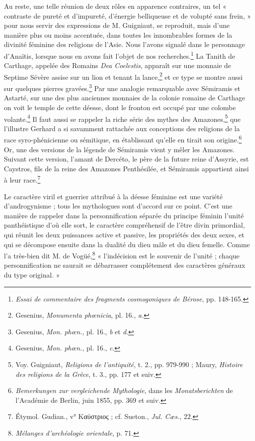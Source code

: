 \documentclass[a4paper, 11pt, oneside, landscape]{article}
\begin{document}
Au reste, une telle réunion de deux rôles en apparence contraires, un tel « contraste de pureté et d'impureté, d'énergie belliqueuse et de volupté sans frein, » pour nous servir des expressions de M. Guigniaut, se reproduit, mais d'une manière plus ou moins accentuée, dans toutes les innombrables formes de la divinité féminine des religions de l'Asie. Nous l'avons signalé dans le personnage d'Anaïtis, lorsque nous en avons fait l'objet de nos recherches.\footnote{\emph{Essai de commentaire des fragments cosmogoniques de Bérose}, pp. 148-165.} La Tanith de Carthage, appelée des Romains \emph{Dea Coelestis}, apparaît sur une monnaie de Septime Sévère assise sur un lion et tenant la lance,\footnote{Gesenius, \emph{Monumenta phœnicia}, pl. 16., \emph{a.}} et ce type se montre aussi sur quelques pierres gravées.\footnote{Gesenius, \emph{Mon. phœn.}, pl. 16., \emph{b} et \emph{d}.} Par une analogie remarquable avec Sémiramis et Astarté, sur une des plus anciennes monnaies de la colonie romaine de Carthage on voit le temple de cette déesse, dont le fronton est occupé par une colombe volante.\footnote{Gesenius, \emph{Mon. phœn.}, pl. 16., \emph{c}.} Il faut aussi se rappeler la riche série des mythes des Amazones,\footnote{Voy. Guigniaut, \emph{Religions de l'antiquité}, t. 2., pp. 979-990 ; Maury, \emph{Histoire des religions de la Grèce}, t. 3., pp. 177 et suiv.} que l'illustre Gerhard a si savamment rattachée aux conceptions des religions de la race syro-phénicienne ou sémitique, en établissant qu'elle en tirait son origine.\footnote{\emph{Bemerkungen zur vergleichende Mythologie}, dans les \emph{Monatsberichten} de l'Académie de Berlin, juin 1855, pp. 369 et suiv.} Or, une des versions de la légende de Sémiramis vient y mêler les Amazones. Suivant cette version, l'amant de Dercéto, le père de la future reine d'Assyrie, est Caystros, fils de la reine des Amazones Penthésilée, et Sémiramis appartient ainsi à leur race.\footnote{Étymol. Gudian., v° Καύστριος ; cf. Sueton., \emph{Jul. Cæs.}, 22.}

Le caractère viril et guerrier attribué à la déesse féminine est une variété d'androgynisme ; tous les mythologues sont d'accord sur ce point. C'est une manière de rappeler dans la personnification séparée du principe féminin l'unité panthéistique d'où elle sort, le caractère compréhensif de l'être divin primordial, qui réunit les deux puissances active et passive, les propriétés des deux sexes, et qui se décompose ensuite dans la dualité du dieu mâle et du dieu femelle. Comme l'a très-bien dit M. de Vogüé,\footnote{\emph{Mélanges d'archéologie orientale}, p. 71.} « l'indécision est le souvenir de l'unité ; chaque personnification ne saurait se débarrasser complétement des caractères généraux du type original. »
\end{document}
